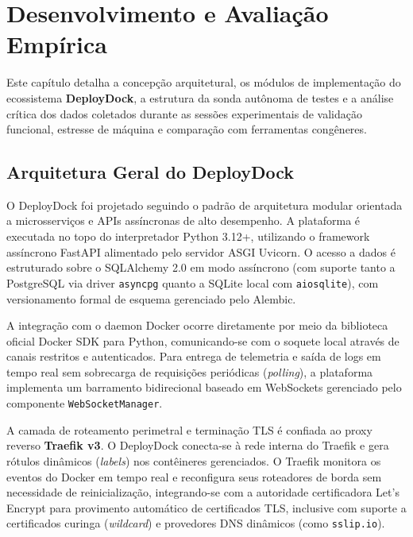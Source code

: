 
\section{Desenvolvimento e Avaliação Empírica}
\label{sec:desenvolvimento}

Este capítulo detalha a concepção arquitetural, os módulos de implementação do ecossistema \textbf{DeployDock}, a estrutura da sonda autônoma de testes e a análise crítica dos dados coletados durante as sessões experimentais de validação funcional, estresse de máquina e comparação com ferramentas congêneres.

\subsection{Arquitetura Geral do DeployDock}
\label{sec:arquitetura-geral}

O DeployDock foi projetado seguindo o padrão de arquitetura modular orientada a microsserviços e APIs assíncronas de alto desempenho. A plataforma é executada no topo do interpretador Python 3.12+, utilizando o framework assíncrono FastAPI alimentado pelo servidor ASGI Uvicorn. O acesso a dados é estruturado sobre o SQLAlchemy 2.0 em modo assíncrono (com suporte tanto a PostgreSQL via driver \texttt{asyncpg} quanto a SQLite local com \texttt{aiosqlite}), com versionamento formal de esquema gerenciado pelo Alembic.

A integração com o daemon Docker ocorre diretamente por meio da biblioteca oficial Docker SDK para Python, comunicando-se com o soquete local através de canais restritos e autenticados. Para entrega de telemetria e saída de logs em tempo real sem sobrecarga de requisições periódicas (\textit{polling}), a plataforma implementa um barramento bidirecional baseado em WebSockets gerenciado pelo componente \texttt{WebSocketManager}.

A camada de roteamento perimetral e terminação TLS é confiada ao proxy reverso \textbf{Traefik v3}. O DeployDock conecta-se à rede interna do Traefik e gera rótulos dinâmicos (\textit{labels}) nos contêineres gerenciados. O Traefik monitora os eventos do Docker em tempo real e reconfigura seus roteadores de borda sem necessidade de reinicialização, integrando-se com a autoridade certificadora Let's Encrypt para provimento automático de certificados TLS, inclusive com suporte a certificados curinga (\textit{wildcard}) e provedores DNS dinâmicos (como \texttt{sslip.io}).

